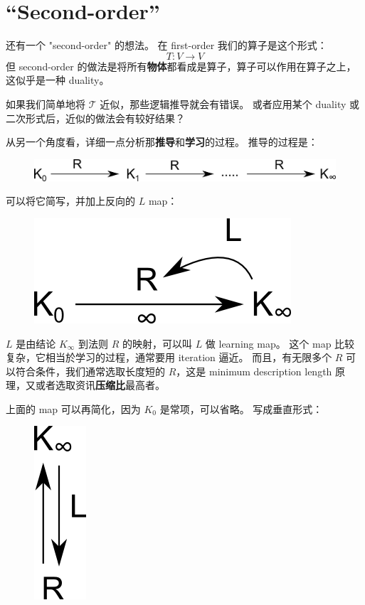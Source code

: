 \documentclass[12pt]{article}
\begin{document}
\section{``Second-order''}

还有一个 "second-order" 的想法。  在 first-order 我们的算子是这个形式：
$$ T: V \rightarrow V $$  
但 second-order 的做法是将所有\textbf{物体}都看成是算子，算子可以作用在算子之上，这似乎是一种 duality。 

如果我们简单地将 $\mathcal{T}$ 近似，那些逻辑推导就会有错误。  或者应用某个 duality 或二次形式后，近似的做法会有较好结果？

从另一个角度看，详细一点分析那\textbf{推导}和\textbf{学习}的过程。  推导的过程是：
\begin{figure}[H]
\centering
\includegraphics[scale=0.6]{2nd-order-maps-0.png}
\end{figure}
可以将它简写，并加上反向的 $L$ map：
\begin{figure}[H]
\centering
\includegraphics[scale=0.6]{2nd-order-maps-1.png}
\end{figure}
$L$ 是由结论 $K_\infty$ 到法则 $R$ 的映射，可以叫 $L$ 做 learning map。  这个 map 比较复杂，它相当於学习的过程，通常要用 iteration 逼近。  而且，有无限多个 $R$ 可以符合条件，我们通常选取长度短的 $R$，这是 minimum description length 原理，又或者选取资讯\textbf{压缩比}最高者。

上面的 map 可以再简化，因为 $K_0$ 是常项，可以省略。  写成垂直形式：
\begin{figure}[H]
\centering
\includegraphics[scale=0.6]{2nd-order-maps-2.png}
\end{figure}
\end{document}
